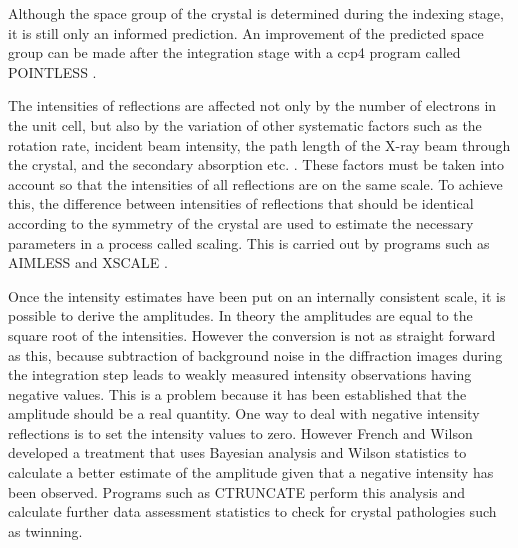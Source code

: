        Although the space group of the crystal is determined during the indexing stage, it is still only an informed prediction.
        An improvement of the predicted space group can be made after the integration stage with a ccp4 program called POINTLESS \cite{evans2011introduction}.

        The intensities of reflections are affected not only by the number of electrons in the unit cell, but also by the variation of other systematic factors such as the rotation rate, incident beam intensity, the path length of the X-ray beam through the crystal, and the secondary absorption etc. \cite{evans2005}.
        These factors must be taken into account so that the intensities of all reflections are on the same scale.
        To achieve this, the difference between intensities of reflections that should be identical according to the symmetry of the crystal are used to estimate the necessary parameters in a process called scaling.
        This is carried out by programs such as AIMLESS \cite{evans2013} and XSCALE \cite{kabsch2010}.

        Once the intensity estimates have been put on an internally consistent scale, it is possible to derive the amplitudes.
        In theory the amplitudes are equal to the square root of the intensities.
        However the conversion is not as straight forward as this, because subtraction of background noise in the diffraction images during the integration step leads to weakly measured intensity observations having negative values.
        This is a problem because it has been established that the amplitude should be a real quantity.
        One way to deal with negative intensity reflections is to set the intensity values to zero.
        However French and Wilson developed a treatment that uses Bayesian analysis \cite{french1978treatment} and Wilson statistics \cite{wilson1949probability} to calculate a better estimate of the amplitude given that a negative intensity has been observed.
        Programs such as CTRUNCATE \cite{evans2011introduction} perform this analysis and calculate further data assessment statistics to check for crystal pathologies such as twinning.

